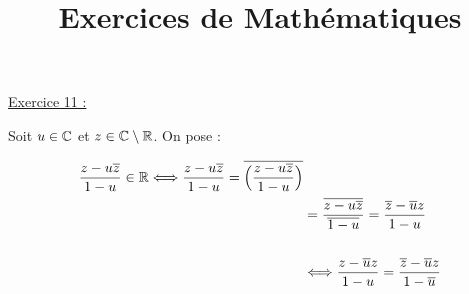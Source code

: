 \documentclass{article}
\title{Exercices de Mathématiques}
\author{}
\date{}
\begin{document}
\maketitle

\underline{Exercice 11 :}

\bigskip
\bigskip
\bigskip

Soit $u\in\mathbb{C}$ et $z\in\mathbb{C} \setminus \mathbb{R}$. On pose :

\begin{align}
\begin{split}
\frac{z-u\overline{z}}{1-u}\in\mathbb{R}
\Longleftrightarrow \frac{z-u\overline{z}}{1-u} = \overline{\Bigl(\frac{z-u\overline{z}}{1-u}\Bigl)}&\\
&= \frac{\overline{z-u\overline{z}}}{\overline{1-u}} = \frac{\overline{z}-\overline{u}z}{1-u}\\
~\\
&\Longleftrightarrow \frac{z-\overline{u}z}{1-u} = \frac{\overline{z}-\overline{u}z}{1-\overline{u}}\\
\end{split}
\end{align}
\end{document}
